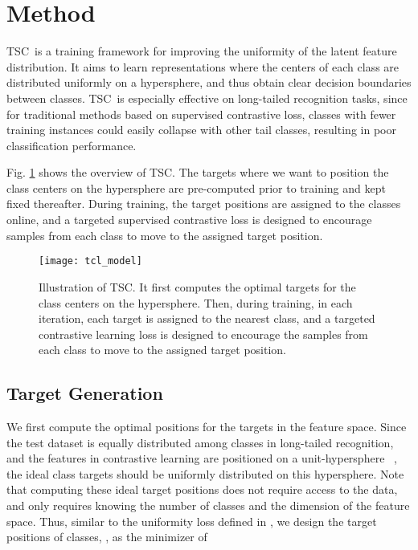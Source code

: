 \documentclass[10pt,twocolumn,letterpaper]{article}
\newcommand{\name} {TSC}
\begin{document}
 \section{Method}

\name~is a training framework for improving the uniformity of the latent feature distribution. It aims to learn representations where the centers of each class are distributed uniformly on a hypersphere, and thus obtain clear decision boundaries between classes. \name~is especially effective on long-tailed recognition tasks, since for traditional methods based on supervised contrastive loss, classes with fewer training instances could easily collapse with other tail classes, resulting in poor classification performance.

Fig. \ref{fig:model} shows the overview of \name. The targets where we want to position the class centers on the hypersphere are pre-computed prior to training and kept fixed thereafter. During training, the target positions are assigned to the classes online, and a targeted supervised contrastive loss is designed to encourage samples from each class to move to the assigned target position.

\begin{figure}[t]
\begin{center}

\texttt{[image: tcl\_model]}
\end{center}
\vspace{-10pt}
\caption{\small Illustration of \name. It first computes the optimal targets for the class centers on the hypersphere. Then, during training, in each iteration, each target is assigned to the nearest class, and a targeted contrastive learning loss is designed to encourage the samples from each class to move to the assigned target position. }
\label{fig:model}
\vspace{-10pt}
\end{figure}

\subsection{Target Generation}







We first compute the optimal positions for the targets in the feature space. Since the test dataset is equally distributed among classes in long-tailed recognition, and the features in contrastive learning are positioned on a unit-hypersphere ~\cite{chen2020simple,he2020momentum}, 
the ideal class targets should be uniformly distributed on this hypersphere. 
Note that computing these ideal target positions does not require access to the data, and only requires knowing the number of classes and the dimension of the feature space. 
Thus, similar to the uniformity loss defined in \cite{wang2020understanding}, we design the target positions of  classes, , as the minimizer of 
\end{document}
